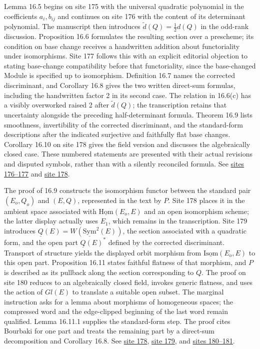 Lemma 16.5 begins on site 175 with the universal quadratic polynomial in the coefficients \(a_i,b_{ij}\) and continues on site 176 with the content of its determinant polynomial. The manuscript then introduces \(\widetilde d(Q)=\tfrac12d(Q)\) in the odd-rank discussion. Proposition 16.6 formulates the resulting section over a prescheme; its condition on base change receives a handwritten addition about functoriality under isomorphisms. Site 177 follows this with an explicit editorial objection to stating base-change compatibility before that functoriality, since the base-changed Module is specified up to isomorphism. Definition 16.7 names the corrected discriminant, and Corollary 16.8 gives the two written direct-sum formulas, including the handwritten factor 2 in its second case. The relation in 16.6(c) has a visibly overworked raised 2 after \(\widetilde d(Q)\); the transcription retains that uncertainty alongside the preceding half-determinant formula. Theorem 16.9 lists smoothness, invertibility of the corrected discriminant, and the standard-form descriptions after the indicated surjective and faithfully flat base changes. Corollary 16.10 on site 178 gives the field version and discusses the algebraically closed case. These numbered statements are presented with their actual revisions and disputed symbols, rather than with a silently reconciled formula. See \href{https://grothendieck.umontpellier.fr/web/viewer.html?file=../25.pdf#page=177}{sites 176--177} and \href{https://grothendieck.umontpellier.fr/web/viewer.html?file=../25.pdf#page=179}{site 178}.

The proof of 16.9 constructs the isomorphism functor between the standard pair \((E_o,Q_o)\) and \((E,Q)\), represented in the text by \(P\). Site 178 places it in the ambient space associated with \(\underline{\mathrm{Hom}}(E_o,E)\) and an open isomorphism scheme; the latter display actually uses \(E_1\), which remains in the transcription. Site 179 introduces \(\underline Q(E)=W(\underline{\mathrm{Sym}}^2(E))\), the section associated with a quadratic form, and the open part \(\underline Q(E)^*\) defined by the corrected discriminant. Transport of structure yields the displayed orbit morphism from \(\underline{\mathrm{Isom}}(E_o,E)\) to this open part. Proposition 16.11 states faithful flatness of that morphism, and \(P\) is described as its pullback along the section corresponding to \(Q\). The proof on site 180 reduces to an algebraically closed field, invokes generic flatness, and uses the action of \(Gl(E)\) to translate a suitable open subset. The marginal instruction asks for a lemma about morphisms of homogeneous spaces; the compressed word and the edge-clipped beginning of the last word remain qualified. Lemma 16.11.1 supplies the standard-form step. The proof cites Bourbaki for one part and treats the remaining part by a direct-sum decomposition and Corollary 16.8. See \href{https://grothendieck.umontpellier.fr/web/viewer.html?file=../25.pdf#page=179}{site 178}, \href{https://grothendieck.umontpellier.fr/web/viewer.html?file=../25.pdf#page=180}{site 179}, and \href{https://grothendieck.umontpellier.fr/web/viewer.html?file=../25.pdf#page=181}{sites 180--181}.

